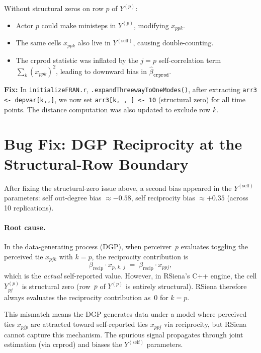 \documentclass[11pt]{article}
\newcommand{\self}{\mathrm{self}}
\begin{document}
Without structural zeros on row $p$ of $Y^{(p)}$:

\begin{itemize}[leftmargin=*]
\item Actor $p$ could make ministeps in $Y^{(p)}$, modifying $x_{ppk}$.
\item The same cells $x_{ppk}$ also live in $Y^{(\self)}$,
      causing double-counting.
\item The crprod statistic was inflated by the $j = p$ self-correlation
      term $\sum_k (x_{ppk})^2$, leading to downward bias in
      $\hat\beta_{\texttt{crprod}}$.
\end{itemize}

\noindent\textbf{Fix:} In \texttt{initializeFRAN.r},
\texttt{.expandThreewayToOneModes()}, after extracting
\texttt{arr3 <- depvar[k,{},{}]}, we now set
\texttt{arr3[k, , ] <- 10} (structural zero) for all time points.
The distance computation was also updated to exclude row $k$.

\section{Bug Fix: DGP Reciprocity at the Structural-Row Boundary}

After fixing the structural-zero issue above, a second bias appeared
in the $Y^{(\self)}$ parameters:
self out-degree bias $\approx -0.58$,
self reciprocity bias $\approx +0.35$
(across 10 replications).

\paragraph{Root cause.}
In the data-generating process (DGP), when perceiver~$p$ evaluates
toggling the perceived tie $x_{pjk}$ with $k = p$, the reciprocity
contribution is
\[
  \beta_{\mathrm{recip}} \cdot x_{p,\,k,\,j}
  \;=\; \beta_{\mathrm{recip}} \cdot x_{ppj},
\]
which is the \emph{actual} self-reported value.
However, in RSiena's C++ engine, the cell $Y^{(p)}_{pj}$ is
structural zero (row~$p$ of $Y^{(p)}$ is entirely structural).
RSiena therefore always evaluates the reciprocity contribution as~0
for $k = p$.

This mismatch means the DGP generates data under a model where
perceived ties $x_{pjp}$ are attracted toward self-reported ties
$x_{ppj}$ via reciprocity, but RSiena cannot capture this mechanism.
The spurious signal propagates through joint estimation (via crprod)
and biases the $Y^{(\self)}$ parameters.
\end{document}
